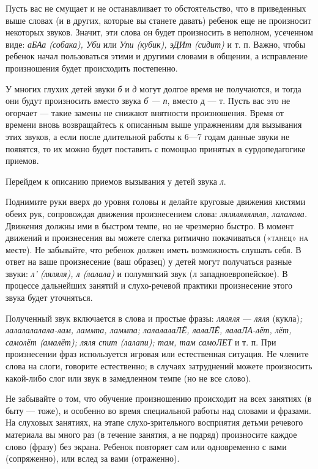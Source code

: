\documentclass[a5paper]{book}
\renewcommand{\emph}[1]{\textit{#1}}
\begin{document}
Пусть вас не смущает и не останавливает то обстоятельство, что в
приведенных выше словах (и в других, которые вы станете давать) ребенок
еще не произносит некоторых звуков. Значит, эти слова он будет
произносить в неполном, усеченном виде: \emph{аБАа (собака), Уби} или
\emph{Упи (кубик), эДИт (сидит)} и т. п. Важно, чтобы ребенок начал
пользоваться этими и другими словами в общении, а исправление
произношения будет происходить постепенно.

У многих глухих детей звуки \emph{б} и \emph{д} могут долгое время не
получаются, и тогда они будут произносить вместо звука \emph{б --- п},
вместо д --- т. Пусть вас это не огорчает --- такие замены не снижают
внятности произношения. Время от времени вновь возвращайтесь к описанным
выше упражнениям для вызывания этих звуков, а если после длительной
работы к 6---7 годам данные звуки не появятся, то их можно будет
поставить с помощью принятых в сурдопедагогике приемов.

Перейдем к описанию приемов вызывания у детей звука \emph{л}.

Поднимите руки вверх до уровня головы и делайте круговые движения
кистями обеих рук, сопровождая движения произнесением слова:
\emph{ляляляляляля, лалалала.} Движения должны ими в быстром темпе, но
не чрезмерно быстро. В момент движений и произнесения вы можете слегка
ритмично покачиваться \textsc{(«танец» на} месте). Не забывайте, что
ребенок должен иметь возможность слушать себя. В ответ на ваше
произнесение (ваш образец) у детей могут получаться разные звуки:
\emph{л' (ляляля), л (лалала)} и полумягкий звук (л западноевропейское).
В процессе дальнейших занятий и слухо-речевой практики произнесение
этого звука будет уточняться.

Полученный звук включается в слова и простые фразы: \emph{ляляля} ---
\emph{ляля} (кукла)\emph{; лалалалалала-лам, ламмпа, ламмпа; лалалалаЛЁ,
лалаЛЁ, лалаЛА-лёт, лёт, самолёт (амалёт); ляля спит (лалапи); там, там
самоЛЕТ} и т. п. При произнесении фраз используется игровая или
естественная ситуация. Не члените слова на слоги, говорите естественно;
в случаях затруднений можете произносить какой-либо слог или звук в
замедленном темпе (но не все слово).

Не забывайте о том, что обучение произношению происходит на всех
занятиях (в быту --- тоже), и особенно во время специальной работы над
словами и фразами. На слуховых занятиях, на этапе слухо-зрительного
восприятия детьми речевого материала вы много раз (в течение занятия, а
не подряд) произносите каждое слово (фразу) без экрана. Ребенок
повторяет сам или одновременно с вами (сопряженно), или вслед за вами
(отраженно).
\end{document}
